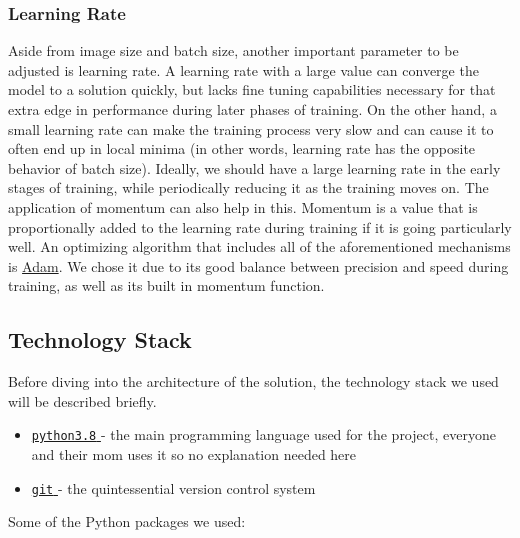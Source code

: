 \documentclass[]{article}
\providecommand{\tightlist}{%
  \setlength{\itemsep}{0pt}\setlength{\parskip}{0pt}}
\let\oldtexttt\texttt
\renewcommand{\texttt}[1]{
  \textcolor{tcolor}{\colorbox{bgcolor}{\oldtexttt{#1}}}
}
\begin{document}
\hypertarget{learning-rate}{%
\subsubsection{Learning Rate}\label{learning-rate}}

Aside from image size and batch size, another important parameter to be
adjusted is learning rate. A learning rate with a large value can
converge the model to a solution quickly, but lacks fine tuning
capabilities necessary for that extra edge in performance during later
phases of training. On the other hand, a small learning rate can make
the training process very slow and can cause it to often end up in local
minima (in other words, learning rate has the opposite behavior of batch
size). Ideally, we should have a large learning rate in the early stages
of training, while periodically reducing it as the training moves on.
The application of momentum can also help in this. Momentum is a value
that is proportionally added to the learning rate during training if it
is going particularly well. An optimizing algorithm that includes all of
the aforementioned mechanisms is
\href{https://arxiv.org/abs/1412.6980}{Adam}. We chose it due to its
good balance between precision and speed during training, as well as its
built in momentum function.

\hypertarget{technology-stack}{%
\subsection{Technology Stack}\label{technology-stack}}

Before diving into the architecture of the solution, the technology
stack we used will be described briefly.

\begin{itemize}
\tightlist
\item
  \href{https://www.python.org/}{\texttt{python3.8}} - the main
  programming language used for the project, everyone and their mom uses
  it so no explanation needed here
\item
  \href{https://hr.wikipedia.org/wiki/Git}{\texttt{git}} - the
  quintessential version control system
\end{itemize}

Some of the Python packages we used:
\end{document}
